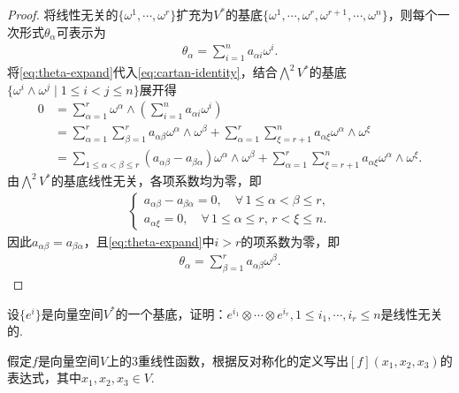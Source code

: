 \documentclass[../../main.tex]{subfiles}%
\begin{document}
\begin{proof}
将线性无关的$\{\omega^1,\cdots,\omega^r\}$扩充为$V^*$的基底$\{\omega^1,\cdots,\omega^r,\omega^{r+1},\cdots,\omega^n\}$，则每个一次形式$\theta_\alpha$可表示为
\begin{align}
\theta_\alpha = \sum\limits_{i=1}^n a_{\alpha i}\omega^i. \label{eq:theta-expand}
\end{align}
将\eqref{eq:theta-expand}代入\eqref{eq:cartan-identity}，结合$\bigwedge^2 V^*$的基底$\{\omega^i\land\omega^j\mid 1\leqslant i<j\leqslant n\}$展开得
\begin{align*}
0 &= \sum\limits_{\alpha=1}^r \omega^\alpha\land\left(\sum\limits_{i=1}^n a_{\alpha i}\omega^i\right) \\
&= \sum\limits_{\alpha=1}^r\sum\limits_{\beta=1}^r a_{\alpha\beta}\omega^\alpha\land\omega^\beta + \sum\limits_{\alpha=1}^r\sum\limits_{\xi=r+1}^n a_{\alpha\xi}\omega^\alpha\land\omega^\xi \\
&= \sum\limits_{1\leqslant\alpha<\beta\leqslant r} (a_{\alpha\beta}-a_{\beta\alpha})\omega^\alpha\land\omega^\beta + \sum\limits_{\alpha=1}^r\sum\limits_{\xi=r+1}^n a_{\alpha\xi}\omega^\alpha\land\omega^\xi.
\end{align*}
由$\bigwedge^2 V^*$的基底线性无关，各项系数均为零，即
\begin{align*}
\begin{cases}
a_{\alpha\beta}-a_{\beta\alpha}=0,\quad \forall\,1\leqslant\alpha<\beta\leqslant r, \\
a_{\alpha\xi}=0,\quad \forall\,1\leqslant\alpha\leqslant r,\,r<\xi\leqslant n.
\end{cases}
\end{align*}
因此$a_{\alpha\beta}=a_{\beta\alpha}$，且\eqref{eq:theta-expand}中$i>r$的项系数为零，即
\begin{align*}
\theta_\alpha = \sum\limits_{\beta=1}^r a_{\alpha\beta}\omega^\beta.
\end{align*}
\end{proof}

\begin{example}
设$\{e^i\}$是向量空间$V^*$的一个基底，证明：$e^{i_1} \otimes \cdots \otimes e^{i_r},1 \leqslant i_1,\cdots,i_r \leqslant n$是线性无关的.
\end{example}

\begin{example}
假定$f$是向量空间$V$上的3重线性函数，根据反对称化的定义写出$[f](x_1,x_2,x_3)$的表达式，其中$x_1,x_2,x_3 \in V$.
\end{example}
\end{document}

